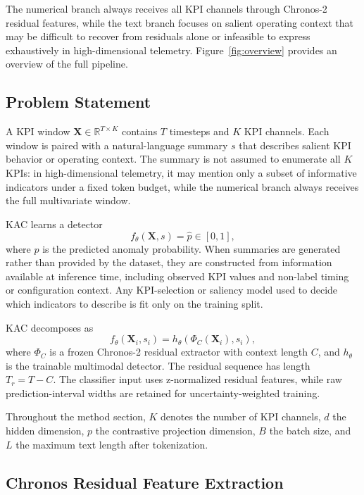 \documentclass[conference]{IEEEtran}
\begin{document}
The numerical branch always receives all KPI channels through Chronos-2 residual features, while the text branch focuses on salient operating context that may be difficult to recover from residuals alone or infeasible to express exhaustively in high-dimensional telemetry.
Figure~\ref{fig:overview} provides an overview of the full pipeline.

\subsection{Problem Statement}
\label{sec:problem}

A KPI window $\mathbf{X} \in \mathbb{R}^{T \times K}$ contains $T$ timesteps and $K$ KPI channels. Each window is paired with a natural-language summary $s$ that describes salient KPI behavior or operating context. The summary is not assumed to enumerate all $K$ KPIs: in high-dimensional telemetry, it may mention only a subset of informative indicators under a fixed token budget, while the numerical branch always receives the full multivariate window.

KAC learns a detector
\begin{equation}
    f_\theta(\mathbf{X}, s)=\hat{p}\in[0,1],
\end{equation}
where $\hat{p}$ is the predicted anomaly probability. When summaries are generated rather than provided by the dataset, they are constructed from information available at inference time, including observed KPI values and non-label timing or configuration context. Any KPI-selection or saliency model used to decide which indicators to describe is fit only on the training split.

KAC decomposes as
\begin{equation}
    f_\theta(\mathbf{X}_i,s_i)
    =
    h_\theta\!\left(\Phi_C(\mathbf{X}_i), s_i\right),
\end{equation}
where $\Phi_C$ is a frozen Chronos-2 residual extractor with context length $C$, and $h_\theta$ is the trainable multimodal detector. The residual sequence has length $T_r=T-C$. The classifier input uses z-normalized residual features, while raw prediction-interval widths are retained for uncertainty-weighted training.

Throughout the method section, $K$ denotes the number of KPI channels, $d$ the hidden dimension, $p$ the contrastive projection dimension, $B$ the batch size, and $L$ the maximum text length after tokenization.

\subsection{Chronos Residual Feature Extraction}
\label{sec:chronos}
\end{document}
